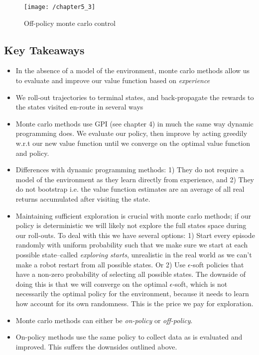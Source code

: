 \begin{figure}[h!]
	\centering
	\texttt{[image: /chapter5\_3]}
	\caption{Off-policy monte carlo control}
	\label{fig:Off-policy monte carlo control}
\end{figure}

\subsection{Key Takeaways}
\begin{itemize}
\item In the absence of a model of the environment, monte carlo methods allow us to evaluate and improve our value function based on \textit{experience}
\item We roll-out trajectories to terminal states, and back-propagate the rewards to the states visited en-route in several ways
\item Monte carlo methods use GPI (see chapter 4) in much the same way dynamic programming does. We evaluate our policy, then improve by acting greedily w.r.t our new value function until we converge on the optimal value function and policy.
\item Differences with dynamic programming methods: 1) They do not require a model of the environment as they learn directly from experience, and 2) They do not bootstrap i.e. the value function estimates are an average of all real returns accumulated after visiting the state.
\item Maintaining sufficient exploration is crucial with monte carlo methods; if our policy is deterministic we will likely not explore the full states space during our roll-outs. To deal with this we have several options: 1) Start every episode randomly with uniform probability such that we make sure we start at each possible state–called \textit{exploring starts}, unrealistic in the real world as we can't make a robot restart from all possible states. Or 2) Use $\epsilon$-soft policies that have a non-zero probability of selecting all possible states. The downside of doing this is that we will converge on the optimal $\epsilon$-soft, which is not necessarily the optimal policy for the environment, because it needs to learn how account for its own randomness. This is the price we pay for exploration.
\item Monte carlo methods can either be \textit{on-policy} or \textit{off-policy}.
\item On-policy methods use the same policy to collect data as is evaluated and improved. This suffers the downsides outlined above.

\end{itemize}
